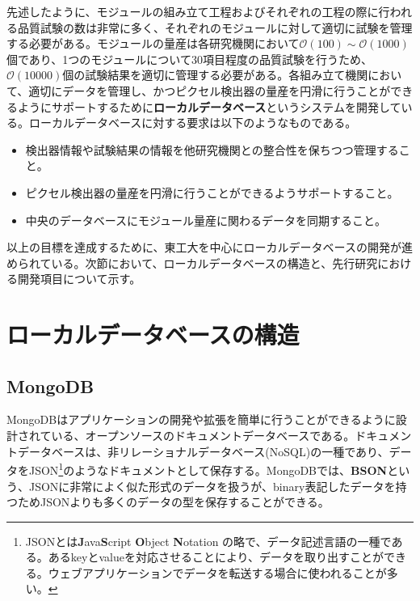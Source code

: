 先述したように、モジュールの組み立て工程およびそれぞれの工程の際に行われる品質試験の数は非常に多く、それぞれのモジュールに対して適切に試験を管理する必要がある。モジュールの量産は各研究機関において$\mathcal{O}(100)\sim \mathcal{O}(1000)$個であり、1つのモジュールについて$30$項目程度の品質試験を行うため、$\mathcal{O}(10000)$個の試験結果を適切に管理する必要がある。各組み立て機関において、適切にデータを管理し、かつピクセル検出器の量産を円滑に行うことができるようにサポートするために\textbf{ローカルデータベース}というシステムを開発している。ローカルデータベースに対する要求は以下のようなものである。
\begin{itemize}
  \item 検出器情報や試験結果の情報を他研究機関との整合性を保ちつつ管理すること。
  \item ピクセル検出器の量産を円滑に行うことができるようサポートすること。
  \item 中央のデータベースにモジュール量産に関わるデータを同期すること。
\end{itemize}

以上の目標を達成するために、東工大を中心にローカルデータベースの開発が進められている。次節において、ローカルデータベースの構造と、先行研究における開発項目について示す。

\section{ローカルデータベースの構造}
\label{sec:AboutLocalDB}










\subsection{MongoDB\cite{mongo}}
\label{sec:mongo}

MongoDBはアプリケーションの開発や拡張を簡単に行うことができるように設計されている、オープンソースのドキュメントデータベースである。ドキュメントデータベースは、非リレーショナルデータベース(NoSQL)の一種であり、データをJSON\footnote{JSONとは\textbf{J}ava\textbf{S}cript \textbf{O}bject \textbf{N}otation の略で、データ記述言語の一種である。あるkeyとvalueを対応させることにより、データを取り出すことができる。ウェブアプリケーションでデータを転送する場合に使われることが多い。}のようなドキュメントとして保存する。MongoDBでは、\textbf{BSON}という、JSONに非常によく似た形式のデータを扱うが、binary表記したデータを持つためJSONよりも多くのデータの型を保存することができる。

